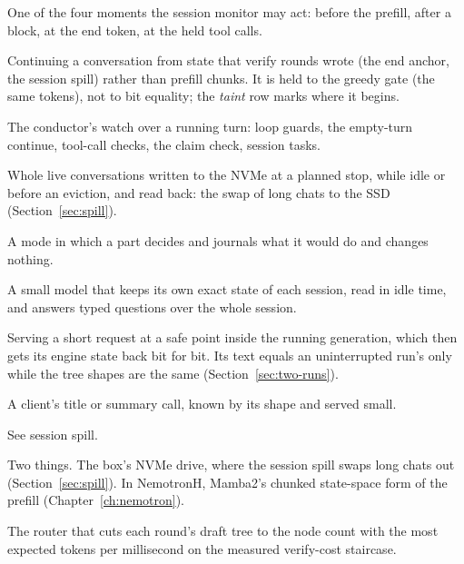 \begin{description}[style=unboxed, leftmargin=0pt, itemsep=.5ex, font=\normalfont\bfseries]
\item[safe point] One of the four moments the session monitor may act: before the prefill, after a block, at the end token, at the held tool calls.

\item[session resume] Continuing a conversation from state that verify rounds wrote (the end anchor, the session spill) rather than prefill chunks. It is held to the greedy gate (the same tokens), not to bit equality; the \emph{taint} row marks where it begins.

\item[session monitor] The conductor's watch over a running turn: loop guards, the empty-turn continue, tool-call checks, the claim check, session tasks.

\item[session spill] Whole live conversations written to the NVMe at a planned stop, while idle or before an eviction, and read back: the swap of long chats to the SSD (Section~\ref{sec:spill}).

\item[shadow] A mode in which a part decides and journals what it would do and changes nothing.

\item[shadow reader] A small model that keeps its own exact state of each session, read in idle time, and answers typed questions over the whole session.

\item[side lane] Serving a short request at a safe point inside the running generation, which then gets its engine state back bit for bit. Its text equals an uninterrupted run's only while the tree shapes are the same (Section~\ref{sec:two-runs}).

\item[side request] A client's title or summary call, known by its shape and served small.

\item[spill] See session spill.

\item[SSD] Two things. The box's NVMe drive, where the session spill swaps long chats out (Section~\ref{sec:spill}). In NemotronH, Mamba2's chunked state-space form of the prefill (Chapter~\ref{ch:nemotron}).

\item[StairCut] The router that cuts each round's draft tree to the node count with the most expected tokens per millisecond on the measured verify-cost staircase.


\end{description}
